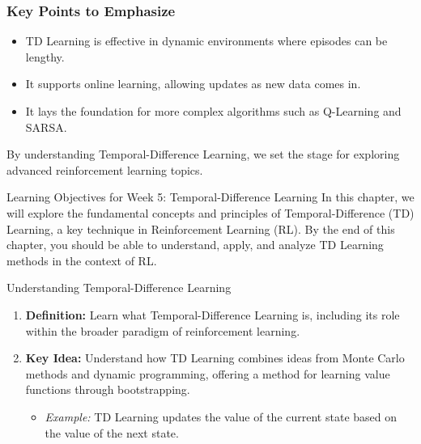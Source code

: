 \documentclass[aspectratio=169]{beamer}
\begin{document}
\begin{frame}[fragile]
    \frametitle{Key Points to Emphasize}
    \begin{itemize}
        \item TD Learning is effective in dynamic environments where episodes can be lengthy.
        \item It supports online learning, allowing updates as new data comes in.
        \item It lays the foundation for more complex algorithms such as Q-Learning and SARSA.
    \end{itemize}
    By understanding Temporal-Difference Learning, we set the stage for exploring advanced reinforcement learning topics.
\end{frame}

\begin{frame}[fragile]{Learning Objectives for Week 5: Temporal-Difference Learning}
    In this chapter, we will explore the fundamental concepts and principles of Temporal-Difference (TD) Learning, a key technique in Reinforcement Learning (RL). By the end of this chapter, you should be able to understand, apply, and analyze TD Learning methods in the context of RL.
\end{frame}

\begin{frame}[fragile]{Understanding Temporal-Difference Learning}
    \begin{enumerate}
        \item \textbf{Definition:} Learn what Temporal-Difference Learning is, including its role within the broader paradigm of reinforcement learning.
        \item \textbf{Key Idea:} Understand how TD Learning combines ideas from Monte Carlo methods and dynamic programming, offering a method for learning value functions through bootstrapping.
        \begin{itemize}
            \item \textit{Example:} TD Learning updates the value of the current state based on the value of the next state.
        \end{itemize}
    \end{enumerate}
\end{frame}
\end{document}
